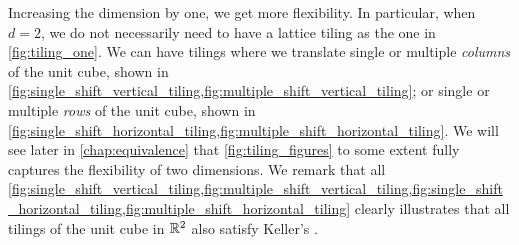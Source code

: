 \documentclass[../thesis.tex]{subfiles}
\begin{document}
Increasing the dimension by one, we get more flexibility. In particular, when $d=2$, we do not necessarily need to have a lattice tiling as the one in \cref{fig:tiling_one}. We can have tilings where we translate single or multiple \emph{columns} of the unit cube, shown in \cref{fig:single_shift_vertical_tiling,fig:multiple_shift_vertical_tiling}; or single or multiple \emph{rows} of the unit cube, shown in \cref{fig:single_shift_horizontal_tiling,fig:multiple_shift_horizontal_tiling}. We will see later in \cref{chap:equivalence} that \cref{fig:tiling_figures} to some extent fully captures the flexibility of two dimensions. We remark that all \cref{fig:single_shift_vertical_tiling,fig:multiple_shift_vertical_tiling,fig:single_shift_horizontal_tiling,fig:multiple_shift_horizontal_tiling} clearly illustrates that all tilings of the unit cube in $\mathbb{R}^2$ also satisfy Keller's . 







\end{document}

